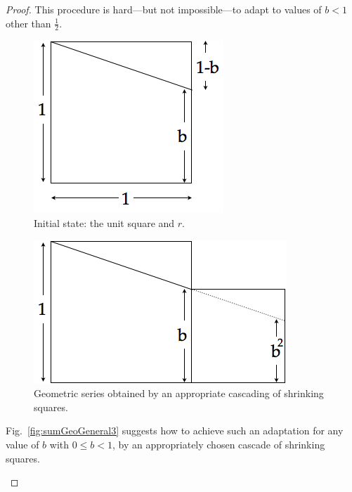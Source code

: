 \begin{proof}

This procedure is hard---but not impossible---to adapt to values of $b
<1$ other than $\frac{1}{2}$.
\begin{figure}[ht]
\begin{center}
       \includegraphics[scale=0.4]{FiguresMaths/SumGeometricGeneral1}
\caption{Initial state: the unit square and $r$.}
       \label{fig:sumGeoGeneral1}
\end{center}
\end{figure}
\begin{figure}[ht]
\begin{center}
       \includegraphics[scale=0.4]{FiguresMaths/SumGeometricGeneral2}
\caption{Geometric series obtained by an appropriate cascading of
  shrinking squares.}
       \label{fig:sumGeoGeneral2}
\end{center}
\end{figure}
Fig.~\ref{fig:sumGeoGeneral3} suggests how to achieve such an
adaptation for any value of $b$ with $0 \leq b <1$, by an
appropriately chosen cascade of shrinking squares.
\begin{figure}[ht]

\end{figure}
\end{proof}
